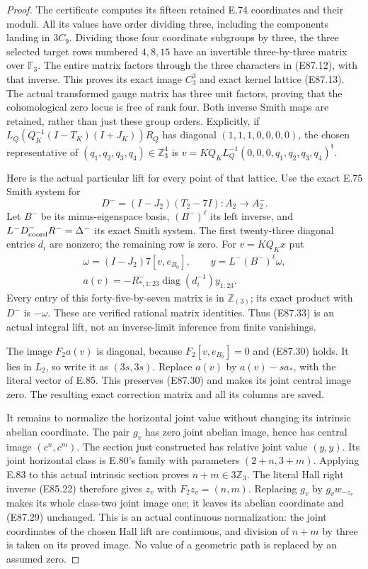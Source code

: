 \begin{proof}
The certificate computes its fifteen retained
E.74 coordinates and their moduli. All its
values have order dividing three, including
the components landing in $3C_9$. Dividing
those four coordinate subgroups by three,
the three selected target rows numbered
$4,8,15$ have an invertible three-by-three
matrix over $\mathbb F_3$. The entire matrix
factors through the three characters in
(E87.12), with that inverse. This proves
its exact image $C_3^3$ and exact kernel
lattice (E87.13). The actual transformed
gauge matrix has three unit factors, proving
that the cohomological zero locus is free
of rank four. Both inverse Smith maps are
retained, rather than just these group orders.
Explicitly, if
$L_Q(Q_K^{-1}(I-T_K)(I+J_K))R_Q$
has diagonal $(1,1,1,0,0,0,0)$,
the chosen representative of
$(q_1,q_2,q_3,q_4)\in\mathbb Z_3^4$ is
$v=KQ_KL_Q^{-1}(0,0,0,q_1,q_2,q_3,q_4)^{\mathsf t}$.

Here is the actual particular lift for every
point of that lattice. Use the exact E.75
Smith system for
\[
 D^-=(I-J_2)(T_2-7I):A_2\longrightarrow A_2^-.
 \tag{E87.32}
\]
Let $B^-$ be its minus-eigenspace basis,
$(B^-)^\ell$ its left inverse, and
$L^-D^-_{\rm coord}R^-=\Delta^-$ its exact
Smith system. The first twenty-three
diagonal entries $d_i$ are nonzero; the
remaining row is zero. For $v=KQ_Kx$ put
\[
 \begin{gathered}
 \omega=(I-J_2)7[v,e_{B_0}],\qquad
 y=L^-(B^-)^\ell\omega,\\
 a(v)=-R^-_{*,1:23}
           \operatorname{diag}(d_i^{-1})y_{1:23}.
 \end{gathered}
 \tag{E87.33}
\]
Every entry of this forty-five-by-seven
matrix is in $\mathbb Z_{(3)}$; its exact
product with $D^-$ is $-\omega$. These
are verified rational matrix identities.
Thus (E87.33) is an actual integral lift,
not an inverse-limit inference from finite
vanishings.

The image $F_2a(v)$ is diagonal, because
$F_2[v,e_{B_0}]=0$ and (E87.30) holds.
It lies in $L_2$, so write it as $(3s,3s)$.
Replace $a(v)$ by $a(v)-s a_*$, with the
literal vector of E.85. This preserves
(E87.30) and makes its joint central image
zero. The resulting exact correction matrix
and all its columns are saved.

It remains to normalize the horizontal joint
value without changing its intrinsic abelian
coordinate. The pair $g_v$ has zero joint
abelian image, hence has central image
$(c^n,c^m)$. The section just constructed has
relative joint value $(y,y)$. Its joint
horizontal class is E.80's family with
parameters $(2+n,3+m)$. Applying E.83 to
this actual intrinsic section proves
$n+m\in3\mathbb Z_3$. The literal Hall
right inverse (E85.22) therefore gives
$z_v$ with $F_2z_v=(n,m)$. Replacing $g_v$
by $g_vw_{-z_v}$ makes its whole class-two
joint image one; it leaves its abelian
coordinate and (E87.29) unchanged.
This is an actual continuous normalization:
the joint coordinates of the chosen Hall
lift are continuous, and division of
$n+m$ by three is taken on its proved
image. No value of a geometric path is
replaced by an assumed zero.


\end{proof}
